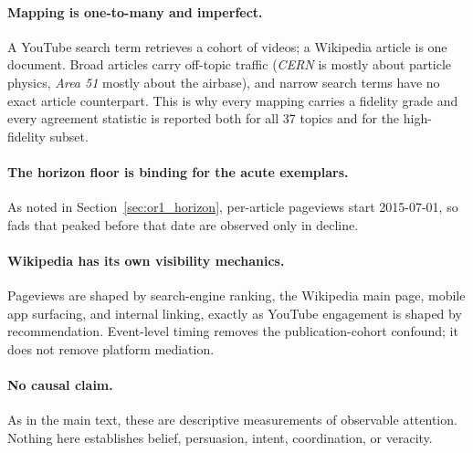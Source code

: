 \documentclass[11pt]{article}
\begin{document}
\paragraph{Mapping is one-to-many and imperfect.}
A YouTube search term retrieves a cohort of videos; a Wikipedia article is one
document. Broad articles carry off-topic traffic (\emph{CERN} is mostly about
particle physics, \emph{Area 51} mostly about the airbase), and narrow search
terms have no exact article counterpart. This is why every mapping carries a
fidelity grade and every agreement statistic is reported both for all 37 topics
and for the high-fidelity subset.

\paragraph{The horizon floor is binding for the acute exemplars.}
As noted in Section~\ref{sec:or1_horizon}, per-article pageviews start
2015-07-01, so fads that peaked before that date are observed only in decline.

\paragraph{Wikipedia has its own visibility mechanics.}
Pageviews are shaped by search-engine ranking, the Wikipedia main page, mobile
app surfacing, and internal linking, exactly as YouTube engagement is shaped by
recommendation. Event-level timing removes the publication-cohort confound; it
does not remove platform mediation.

\paragraph{No causal claim.}
As in the main text, these are descriptive measurements of observable attention.
Nothing here establishes belief, persuasion, intent, coordination, or veracity.
\end{document}

